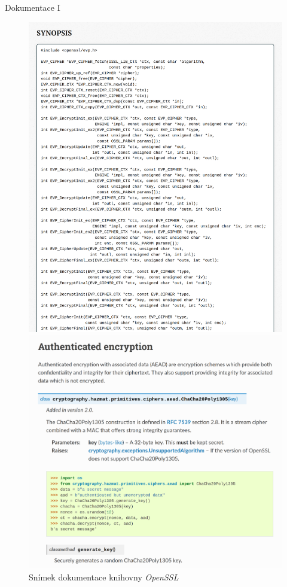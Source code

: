 \documentclass{beamer}
\begin{document}
\begin{frame}{Dokumentace I}
    \begin{figure}
        \centering
        \begin{minipage}{0.42\textwidth}
            \centering
            \includegraphics[width=\textwidth]{media/doc-openssl.png}
            \caption{Snímek dokumentace knihovny \textit{OpenSSL} \cite{openssldoc}}
        \end{minipage}\hfill
        \begin{minipage}{0.53\textwidth}
            \centering
            \includegraphics[width=\textwidth]{media/doc-pyca.png}

\end{minipage}
\end{figure}
\end{frame}
\end{document}
